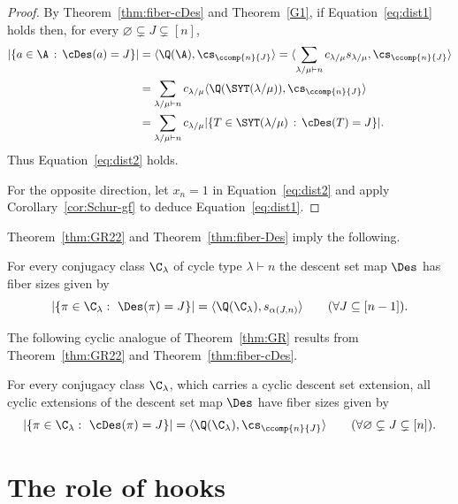 \begin{proof}
    By Theorem~\ref{thm:fiber-cDes} and Theorem~\ref{G1},
    if Equation~\eqref{eq:dist1} holds then,
    for every $\varnothing \subsetneq J \subsetneq [n]$,
    \begin{align*}
        |\{a \in \A \,:\, \cDes(a) = J\}| 
        &= \langle \Q(\A), \cs_{\ccomp{n}{J}} \rangle
        = \langle \sum\limits_{\lambda/\mu\vdash n} c_{\lambda/\mu} s_{\lambda/\mu}, \cs_{\ccomp{n}{J}} \rangle \\
        &= \sum\limits_{\lambda/\mu\vdash n} c_{\lambda/\mu} \langle \Q(\SYT(\lambda/\mu)), \cs_{\ccomp{n}{J}} \rangle \\
        &= \sum\limits_{\lambda/\mu\vdash n} c_{\lambda/\mu} |\{T \in \SYT(\lambda/\mu) \,:\, \cDes(T) =J\}|.
    \end{align*}
    Thus Equation~\eqref{eq:dist2} holds.

    For the opposite direction, let $x_n=1$ in Equation~\eqref{eq:dist2} and apply Corollary~\ref{cor:Schur-gf} to deduce  Equation~\eqref{eq:dist1}.
\end{proof}

Theorem~\ref{thm:GR22} and Theorem~\ref{thm:fiber-Des} imply the following. 

\begin{theorem}[{\cite[Theorem 2.1]{GR}}]\label{thm:GR}
    For every 
    conjugacy class $\C_\lambda$ of cycle type $\lambda \vdash n$ the
    descent set map $\Des$
    has fiber sizes given by
    \[
        |\{\pi \in \C_\lambda :\ 
        \Des(\pi)=J\}| = \langle \Q(\C_\lambda),  s_{\alpha(J,n)}\rangle
        \qquad (\forall J\subseteq [n-1]).
    \]
\end{theorem}

The following cyclic analogue of Theorem~\ref{thm:GR} results from Theorem~\ref{thm:GR22} and Theorem~\ref{thm:fiber-cDes}.
	
\begin{theorem}\label{thm:main22}
	For every conjugacy class $\C_\lambda$, which carries a cyclic descent set extension,
	all cyclic extensions of the descent set map $\Des$ 
	have fiber sizes given by
	\[
		|\{\pi\in \C_\lambda :\ \cDes(\pi)=J\}|=\langle \Q(\C_\lambda), \cs_{\ccomp{n}{J}} \rangle \qquad (\forall \varnothing \subsetneq J\subsetneq [n]).
	\]
\end{theorem}

		
\section{The role of hooks}\label{sec:hooks}

